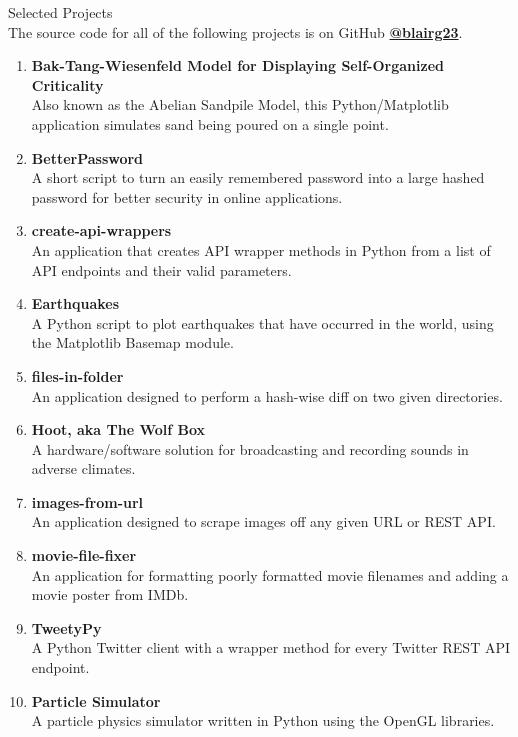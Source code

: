 \documentclass[oneside]{article}%
\begin{document}
\noindent
\huge{Selected Projects}\\
\small
The source code for all of the following projects is on GitHub \textbf{\href{https://github.com/blairg23}{@blairg23}}.
\begin{enumerate}[]
	\item \textbf{Bak-Tang-Wiesenfeld Model for Displaying Self-Organized Criticality}\\
		Also known as the Abelian Sandpile Model, this Python/Matplotlib application simulates sand being poured on a single point.
	\item \textbf{BetterPassword}\\
		A short script to turn an easily remembered password into a large hashed password for better security in online applications.
	\item \textbf{create-api-wrappers}\\
		An application that creates API wrapper methods in Python from a list of API endpoints and their valid parameters.
	\item \textbf{Earthquakes}\\
		A Python script to plot earthquakes that have occurred in the world, using the Matplotlib Basemap module.
	\item \textbf{files-in-folder}\\
		An application designed to perform a hash-wise diff on two given directories.
	\item \textbf{Hoot, aka The Wolf Box}\\
		A hardware/software solution for broadcasting and recording sounds in adverse climates.
	\item \textbf{images-from-url}\\
		An application designed to scrape images off any given URL or REST API.
	\item \textbf{movie-file-fixer}\\
		An application for formatting poorly formatted movie filenames and adding a movie poster from IMDb.
	\item \textbf{TweetyPy}\\
		A Python Twitter client with a wrapper method for every Twitter REST API endpoint.
	\item \textbf{Particle Simulator}\\
		A particle physics simulator written in Python using the OpenGL libraries.
\end{enumerate}
\end{document}
